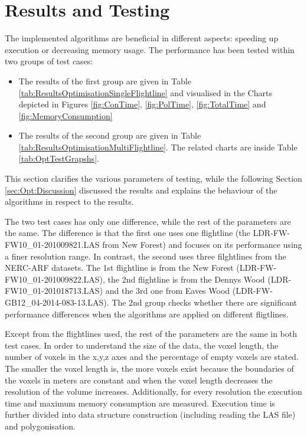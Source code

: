 \documentclass{subfiles}
\begin{document}

\section{Results and Testing}

\par The implemented algorithms are beneficial in different aspects: speeding up execution or decreasing memory usage. The performance has been tested within two groups of test cases:

\begin{itemize}
	\item The results of the first group are given in Table \ref{tab:ResultsOptimisationSingleFlightline} and visualised in the Charts depicted in Figures \ref{fig:ConTime}, \ref{fig:PolTime}, \ref{fig:TotalTime} and \ref{fig:MemoryConsumption}
	\item The results of the second group are given in Table \ref{tab:ResultsOptimisationMultiFlightline}. The related charts are inside Table \ref{tab:OptTestGrapshs}. 
\end{itemize}
 \par This section clarifies the various parameters of testing, while the following Section \ref{sec:Opt:Discussion} discussed the results and explains the behaviour of the algorithms in respect to the results. 

\par The two test cases has only one difference, while the rest of the parameters are the same. The difference is that the first one uses one flightline (the LDR-FW-FW10\_01-201009821.LAS from New Forest) and focuses on its performance using a finer resolution range. In contrast, the second uses three filghtlines from the NERC-ARF datasets. The 1st flightline is from the New Forest (LDR-FW-FW10\_01-201009822.LAS), the 2nd flightline is from the Dennys Wood  (LDR-FW10\_01-201018713.LAS) and the 3rd one from Eaves Wood (LDR-FW-GB12\_04-2014-083-13.LAS). The 2nd group checks whether there are significant performance differences when the algorithms are applied on different fligtlines. 

\par Except from the flightlines used, the rest of the parameters are the same in both test cases. In order to understand the size of the data, the voxel length, the number of voxels in the x,y,z axes and the percentage of empty voxels are stated. The smaller the voxel length is, the more voxels exist because the boundaries of the voxels in meters are constant and when the voxel length decreases the resolution of the volume increases. Additionally, for every resolution the execution time and maximum memory consumption are measured. Execution time is further divided into data structure construction (including reading the LAS file) and polygonisation. 
\end{document}
